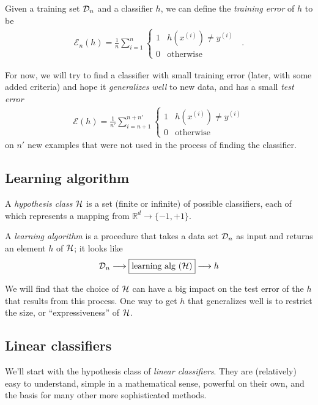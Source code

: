 \documentclass[11pt]{article}
\newcommand\ex[2]{#1^{(#2)}}
\newcommand\data{{\cal D}}
\newcommand\hclass{{\cal H}}
\newcommand{\R}{\mathbb{R}}
\newcommand{\trainerr}{\mathcal{E}_n}
\begin{document}
Given a training set $\data_n$ and a classifier $h$, we can define the
{\em{training error}} of $h$ to be
\begin{eqnarray*}
  \trainerr(h) = \frac{1}{n}\sum_{i = 1}^{n}\begin{cases} 1 &
  h(\ex{x}{i}) \ne \ex{y}{i} \\ 0 & \text{otherwise}\end{cases}
  \;\;.
  \end{eqnarray*}

For now, we will try to find a classifier with small training error
(later, with some added criteria) and hope it {\em{generalizes well}}
to new data, and has a small {\em test error}
\begin{eqnarray*}
  \mathcal{E}(h) = \frac{1}{n'}\sum_{i = n + 1}^{n + n'}\begin{cases}
    1 & h(x^{(i)}) \ne y^{(i)} \\ 0 & \text{otherwise}\end{cases}
  \end{eqnarray*}
on $n'$ new examples that were not used in the process of finding the
classifier.  

\subsection{Learning algorithm}
A {\em hypothesis class} $\hclass$ is a set (finite or infinite) of
possible classifiers, each of which represents a mapping from 
$\R^d \rightarrow \{-1, +1\}$.

A {\em learning algorithm} is a 
procedure that takes a data set $\data_n$ as input and returns an
element $h$ of $\hclass$;  it looks  like
\begin{equation*}
  \data_n \longrightarrow \boxed{\text{learning alg ($\hclass$)}} \longrightarrow h
\end{equation*}

We will find that the choice of $\hclass$ can have a big impact on the
test error of the $h$ that results from this process.  
One way to get $h$ that generalizes well is to restrict the size, or
``expressiveness'' of $\hclass$. 

\subsection{Linear classifiers}

We'll start with the hypothesis class of {\em linear classifiers}.
They are (relatively) easy to understand, simple in a mathematical
sense, powerful on their own, and the basis for many other more
sophisticated methods.
\end{document}
